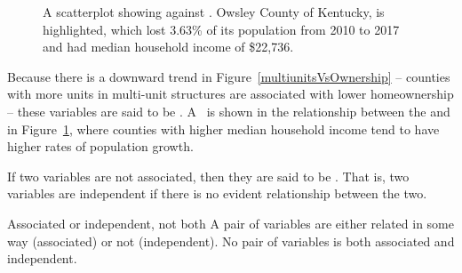 

\begin{figure}
  \centering
  \caption{A scatterplot showing
      against .
      Owsley County of Kentucky, is highlighted,
      which lost 3.63\% of its population from 2010 to 2017
      and had median household income of \$22,736.}
  \label{pop_change_v_med_income}
\end{figure}

Because there is a downward trend in
Figure~\ref{multiunitsVsOwnership} --
counties with more units in multi-unit structures
are associated with lower homeownership --
these variables are said to be
.
A~ is shown in the relationship
between the
and 
in Figure~\ref{pop_change_v_med_income},
where counties with higher median household income tend
to have higher rates of population growth.

If two variables are not associated,
then they are said to be .
That is, two variables are independent if there
is no evident relationship between the two.

\begin{onebox}{Associated or independent, not both}
A pair of variables are either related in some way (associated) or not (independent). No pair of variables is both associated and independent.
\end{onebox}



